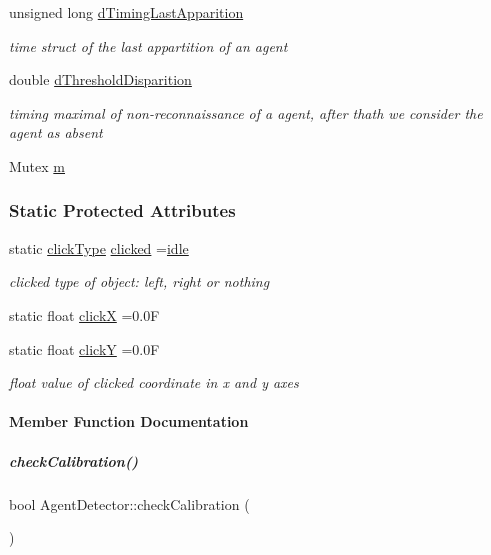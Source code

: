 \begin{DoxyCompactItemize}
unsigned long \hyperlink{group__agentDetector_ad9ac37b9a9ba8db75e99aec3aa6cdecd}{d\+Timing\+Last\+Apparition}
\begin{DoxyCompactList}\small\item\em time struct of the last appartition of an agent \end{DoxyCompactList}\item 
double \hyperlink{group__agentDetector_a43e5c578387b472710786a5665d8244e}{d\+Threshold\+Disparition}
\begin{DoxyCompactList}\small\item\em timing maximal of non-\/reconnaissance of a agent, after thath we consider the agent as absent \end{DoxyCompactList}\item 
Mutex \hyperlink{group__agentDetector_acafd08537c8ad4ace4fd067eb473cc99}{m}
\end{DoxyCompactItemize}
\subsubsection*{Static Protected Attributes}
\begin{DoxyCompactItemize}
\item 
static \hyperlink{group__agentDetector_ga25ebeb7c406dcf4415f5126894542df2}{click\+Type} \hyperlink{group__agentDetector_ad4e5781343294574e5f3e4fd71d45c12}{clicked} =\hyperlink{group__agentDetector_gga25ebeb7c406dcf4415f5126894542df2a0e9a37114c0e458d28d52f06ec0f2242}{idle}
\begin{DoxyCompactList}\small\item\em clicked type of object\+: left, right or nothing \end{DoxyCompactList}\item 
static float \hyperlink{group__agentDetector_a03df7736aa16aabd5c50b122b1bbac4a}{clickX} =0.\+0F
\item 
static float \hyperlink{group__agentDetector_ab855a695c17b0ce07aab0356c5a53d1f}{clickY} =0.\+0F
\begin{DoxyCompactList}\small\item\em float value of clicked coordinate in x and y axes \end{DoxyCompactList}\end{DoxyCompactItemize}


\paragraph{Member Function Documentation}
\mbox{\label{group__agentDetector_aff2af42266faa0da3afc95a062b4f1d0}} 
\subparagraph{\texorpdfstring{check\+Calibration()}{checkCalibration()}}
{\footnotesize\ttfamily bool Agent\+Detector\+::check\+Calibration (\begin{DoxyParamCaption}{ }\end{DoxyParamCaption})}



